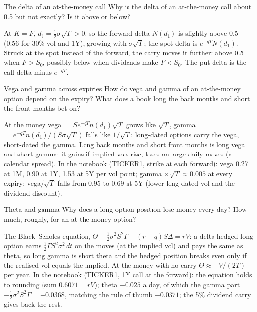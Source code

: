 \begin{question}{\Theory {}}{The delta of an at-the-money call}
Why is the delta of an at-the-money call about 0.5 but not exactly? Is it above or below?
\end{question}
\begin{answer}
At $K = F$, $d_1 = \tfrac12\sigma\sqrt T > 0$, so the forward delta $N(d_1)$ is slightly above 0.5 (0.56 for 30\% vol
and 1Y), growing with $\sigma\sqrt T$; the spot delta is $e^{-qT}N(d_1)$. Struck at the spot instead of the forward,
the carry moves it further: above 0.5 when $F > S_0$, possibly below when dividends make $F < S_0$. The put delta is the
call delta minus $e^{-qT}$.
\end{answer}

\begin{question}{\Theory \Practice {}}{Vega and gamma across expiries}
How do vega and gamma of an at-the-money option depend on the expiry? What does a book long the back months and short
the front months bet on?
\end{question}
\begin{answer}
At the money vega $= S e^{-qT}n(d_1)\sqrt T$ grows like $\sqrt T$, gamma $= e^{-qT}n(d_1)/(S\sigma\sqrt T)$ falls like
$1/\sqrt T$: long-dated options carry the vega, short-dated the gamma. Long back months and short front months is
long vega and short gamma: it gains if implied vols rise, loses on large daily moves (a calendar spread). In the
notebook (TICKER1, strike at each forward): vega 0.27 at 1M, 0.90 at 1Y, 1.53 at 5Y per vol point; gamma
$\times\sqrt T \approx 0.005$ at every expiry; vega$/\sqrt T$ falls from 0.95 to 0.69 at 5Y (lower long-dated vol and
the dividend discount).
\end{answer}

\begin{question}{\Theory \Practice {}}{Theta and gamma}
Why does a long option position lose money every day? How much, roughly, for an at-the-money option?
\end{question}
\begin{answer}
The Black--Scholes equation, $\Theta + \tfrac12\sigma^2S^2\Gamma + (r - q)S\Delta = rV$: a delta-hedged long option earns
$\tfrac12\Gamma S^2\sigma^2\,dt$ on the moves (at the implied vol) and pays the same as theta, so long gamma is short theta
and the hedged position breaks even only if the realised vol equals the implied. At the money with no carry
$\Theta \approx -V/(2T)$ per year. In the notebook (TICKER1, 1Y call at the forward): the equation holds to rounding
(sum $0.6071 = rV$); theta $-0.025$ a day, of which the gamma part $-\tfrac12\sigma^2S^2\Gamma = -0.0368$, matching the
rule of thumb $-0.0371$; the 5\% dividend carry gives back the rest.
\end{answer}

